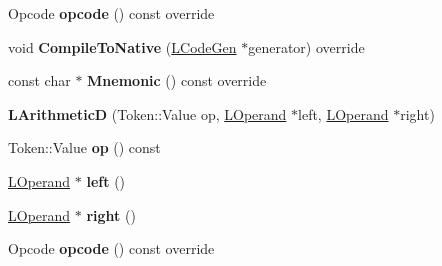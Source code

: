 \begin{DoxyCompactItemize}
\item 
Opcode {\bfseries opcode} () const  override\hypertarget{classv8_1_1internal_1_1_l_arithmetic_d_a6371d86c37944a1a90b2e4778d0b7024}{}\label{classv8_1_1internal_1_1_l_arithmetic_d_a6371d86c37944a1a90b2e4778d0b7024}

\item 
void {\bfseries Compile\+To\+Native} (\hyperlink{classv8_1_1internal_1_1_l_code_gen}{L\+Code\+Gen} $\ast$generator) override\hypertarget{classv8_1_1internal_1_1_l_arithmetic_d_a87834ef9f5e37f8ade4c8e8ef4284572}{}\label{classv8_1_1internal_1_1_l_arithmetic_d_a87834ef9f5e37f8ade4c8e8ef4284572}

\item 
const char $\ast$ {\bfseries Mnemonic} () const  override\hypertarget{classv8_1_1internal_1_1_l_arithmetic_d_a401c29ddc6c8aa2dc41d23d4be14aff7}{}\label{classv8_1_1internal_1_1_l_arithmetic_d_a401c29ddc6c8aa2dc41d23d4be14aff7}

\item 
{\bfseries L\+ArithmeticD} (Token\+::\+Value op, \hyperlink{classv8_1_1internal_1_1_l_operand}{L\+Operand} $\ast$left, \hyperlink{classv8_1_1internal_1_1_l_operand}{L\+Operand} $\ast$right)\hypertarget{classv8_1_1internal_1_1_l_arithmetic_d_aad5c45947dcad72abbbcd55b081f4e6e}{}\label{classv8_1_1internal_1_1_l_arithmetic_d_aad5c45947dcad72abbbcd55b081f4e6e}

\item 
Token\+::\+Value {\bfseries op} () const \hypertarget{classv8_1_1internal_1_1_l_arithmetic_d_a0689ba0a4deee0bb4450bb0fdc7f877b}{}\label{classv8_1_1internal_1_1_l_arithmetic_d_a0689ba0a4deee0bb4450bb0fdc7f877b}

\item 
\hyperlink{classv8_1_1internal_1_1_l_operand}{L\+Operand} $\ast$ {\bfseries left} ()\hypertarget{classv8_1_1internal_1_1_l_arithmetic_d_a8d143eb5deb9725b2544b7ecc1a6b7aa}{}\label{classv8_1_1internal_1_1_l_arithmetic_d_a8d143eb5deb9725b2544b7ecc1a6b7aa}

\item 
\hyperlink{classv8_1_1internal_1_1_l_operand}{L\+Operand} $\ast$ {\bfseries right} ()\hypertarget{classv8_1_1internal_1_1_l_arithmetic_d_ad78701fa7af5138fc5a741a1ceed96a7}{}\label{classv8_1_1internal_1_1_l_arithmetic_d_ad78701fa7af5138fc5a741a1ceed96a7}

\item 
Opcode {\bfseries opcode} () const  override\hypertarget{classv8_1_1internal_1_1_l_arithmetic_d_a6371d86c37944a1a90b2e4778d0b7024}{}\label{classv8_1_1internal_1_1_l_arithmetic_d_a6371d86c37944a1a90b2e4778d0b7024}


\end{DoxyCompactItemize}
